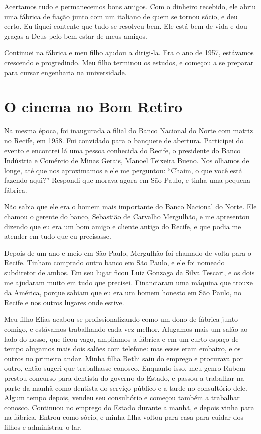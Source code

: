 Acertamos tudo e permanecemos bons amigos. Com o dinheiro recebido, ele abriu uma fábrica de fiação junto com um italiano de quem se tornou sócio, e deu
certo. Eu fiquei contente que tudo se resolveu bem. Ele está bem de
vida e dou graças a Deus pelo bem estar de meus amigos.

Continuei na fábrica e meu filho ajudou a dirigi-la. Era o ano
de 1957, estávamos crescendo e progredindo. Meu filho
terminou os estudos, e começou a se preparar para cursar engenharia na universidade.

\chapter{O cinema no Bom Retiro}

Na mesma época, foi inaugurada a filial do Banco Nacional do Norte com
matriz no Recife, em 1958. Fui convidado para o
banquete de abertura. Participei do evento e encontrei lá uma pessoa conhecida do Recife, o presidente do Banco
Indústria e Comércio de Minas Gerais, Manoel Teixeira Bueno.
Nos olhamos de longe, até que nos aproximamos e ele me perguntou:
``Chaim, o que você está fazendo aqui?'' Respondi que morava agora em São
Paulo, e tinha uma pequena fábrica.

Não sabia que ele era o homem mais importante do Banco Nacional do
Norte. Ele chamou o gerente do banco, Sebastião de Carvalho Mergulhão, e
me apresentou dizendo que eu era um bom amigo e cliente antigo do
Recife, e que podia me atender em tudo que eu precisasse.

Depois de um ano e meio em São Paulo, Mergulhão foi chamado de volta
para o Recife. Tinham comprado outro banco em São Paulo, e
ele foi nomeado subdiretor de ambos. Em seu lugar ficou Luiz Gonzaga da
Silva Tescari, e os dois me ajudaram muito em tudo que precisei.
Financiaram uma máquina que trouxe da América, porque sabiam que eu era
um homem honesto em São Paulo, no Recife e nos outros lugares onde estive.

Meu filho Elias acabou se profissionalizando como um dono de fábrica junto comigo, e
estávamos trabalhando cada vez melhor. Alugamos mais um salão ao lado do
nosso, que ficou vago, ampliamos a fábrica e em um curto espaço de
tempo alugamos mais dois salões com telefone: mas esses eram
embaixo, e os outros no primeiro andar. Minha filha Bethi saiu do
emprego e procurava por outro, então sugeri que trabalhasse
conosco. Enquanto isso, meu genro Rubem prestou concurso para dentista do governo do
Estado, e passou a trabalhar na parte da manhã como dentista do serviço
público e a tarde no consultório dele. Algum tempo depois, vendeu seu
consultório e começou também a trabalhar conosco. Continuou
no emprego do Estado durante a manhã, e depois vinha para na fábrica. Entrou 
como sócio, e minha filha voltou para casa para cuidar dos filhos e
administrar o lar.

